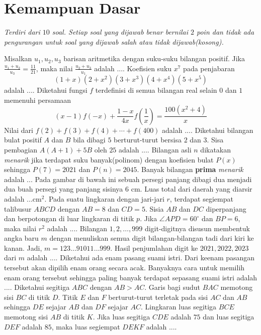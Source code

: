 \section*{Kemampuan Dasar}
\emph{Terdiri dari $10$ soal. Setiap soal yang dijawab benar bernilai $2$ poin dan tidak ada pengurangan untuk soal yang dijawab salah atau tidak dijawab(kosong).}
\begin{questions}
\question Misalkan $u_1,u_2,u_3$ barisan aritmetika dengan suku-suku bilangan positif. Jika $\frac{u_1+u_2}{u_3}=\frac{11}{21}$, maka nilai $\frac{u_2+u_3}{u_1}$ adalah ....
\question Koefisien suku $x^7$ pada penjabaran 
\[(1+x)(2+x^2)(3+x^3)(4+x^4)(5+x^5)\]
adalah ....
\question Diketahui fungsi $f$ terdefinisi di semua bilangan real selain $0$ dan $1$ memenuhi persamaan 
\[(x-1)f(-x)+\frac{1-x}{4x}f\left(\frac{1}{x}\right)=\frac{100(x^2+4)}{x}\]
Nilai dari $f(2)+f(3)+f(4)+\cdots+f(400)$ adalah ....
\question Diketahui bilangan bulat positif $A$ dan $B$ bila dibagi $5$ berturut-turut bersisa $2$ dan $3$. Sisa pembagian $A(A+1)+5B$ oleh $25$ adalah ....
\question Bilangan asli $n$ dikatakan \emph{menarik} jika terdapat suku banyak(polinom) dengan koefisien bulat $P(x)$ sehingga $P(7)=2021$ dan $P(n)=2045$. Banyak bilangan \textbf{prima} \emph{menarik} adalah ... 
\question Pada gambar di bawah ini sebuah persegi panjang dibagi dua menjadi dua buah persegi yang panjang sisinya $6$ cm. Luas total dari daerah yang diarsir adalah ...$\text{cm}^2$. 
\question Pada suatu lingkaran dengan jari-jari $r$, terdapat segiempat talibusur $ABCD$ dengan $AB=8$ dan $CD=5$. Sisia $AB$ dan $DC$ diperpanjang dan berpotongan di luar lingkaran di titik $p$. Jika $\angle APD=60^\circ$ dan $BP=6$, maka nilai $r^2$ adalah .... 
\question Bilangan $1,2,\ldots, 999$ digit-digitnya disusun membentuk angka baru $m$ dengan menuliskan semua digit bilangan-bilangan tadi dari kiri ke kanan. Jadi, $m=123\ldots 91011\ldots999$. Hasil penjumlahan digit ke $2021,2022,2023$ dari $m$ adalah ....
\question Diketahui ada enam pasang suami istri. Dari keenam pasangan tersebut akan dipilih enam orang secara acak. Banyaknya cara untuk memilih enam orang tersebut sehingga paling banyak terdapat sepasang suami istri adalah ....
\question Diketahui segitiga $ABC$ dengan $AB>AC$. Garis bagi sudut $BAC$ memotong sisi $BC$ di titik $D$. Titik $E$ dan $F$ berturut-turut terletak pada sisi $AC$ dan $AB$ sehingga $DE$ sejajar $AB$ dan $DF$ sejajar $AC$. Lingkaran luas segitiga $BCE$ memotong sisi $AB$ di titik $K$. Jika luas segitiga $CDE$ adalah $75$ dan luas segitiga $DEF$ adalah $85$, maka luas segiempat $DEKF$ adalah ....

\end{questions}
